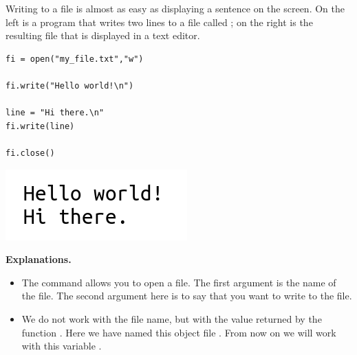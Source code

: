 \documentclass[11pt,class=report,crop=false]{standalone}
\begin{document}



\begin{cours}


Writing to a file is almost as easy as displaying a sentence on the screen.
On the left is a program that writes two lines to a file called ; on the right is the resulting file that is displayed in a text editor.
\begin{center}
\begin{minipage}{0.5\textwidth}
\begin{lstlisting}
fi = open("my_file.txt","w")

fi.write("Hello world!\n")

line = "Hi there.\n"
fi.write(line)

fi.close()
\end{lstlisting}
\end{minipage}
\begin{minipage}{0.3\textwidth}
\includegraphics[scale=\myscale,scale=0.5]{screen-files-lesson-1-en}
\end{minipage}
\end{center}


\textbf{Explanations.}
\begin{itemize}
  \item The command  allows you to open a file. The first argument is the name of the file. The second argument here is  to say that you want to write to the file.
  
  \item We do not work with the file name, but with the value returned by the function . Here we have named this object file . From now on we will work with this variable .
  

\end{itemize}
\end{cours}
\end{document}
